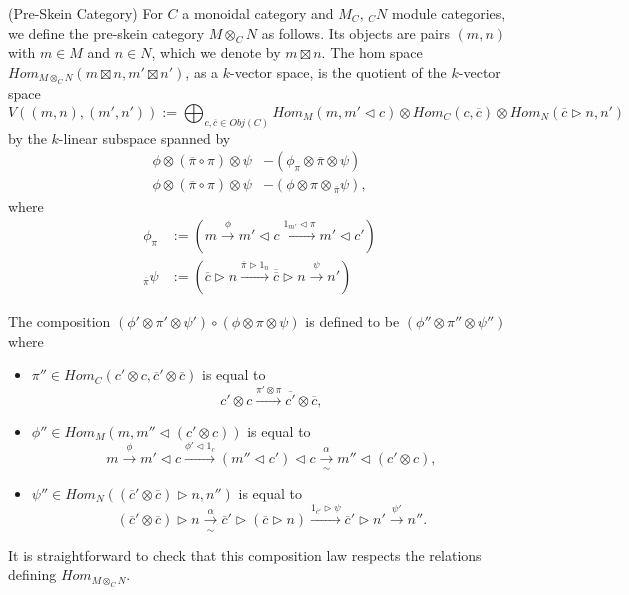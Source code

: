 \begin{definition}\label{pre-skein} (Pre-Skein Category)
  For $C$ a monoidal category and $M_C$, $_{C}N$ module categories, we define
  the pre-skein category $M\otimes_C N$ as follows. Its objects are pairs $(m,n)$ with
  $m\in M$ and $n\in N$, which we denote by $m\boxtimes n$. The hom space
  $Hom_{M\otimes_C N}(m\boxtimes n, m'\boxtimes n')$, as a $k$-vector space, is the quotient
  of the $k$-vector space $$V((m,n),(m',n')):=\bigoplus_{c,\overline{c} \in Obj(C)} Hom_{M}(m, m' \lhd c) \otimes Hom_{C}(c,\overline{c}) \otimes Hom_{N} (\overline{c} \rhd n, n')$$
  by the $k$-linear subspace spanned by
  \begin{align}
    \phi \otimes (\overline{\pi} \circ \pi) \otimes \psi &- (\phi_{\pi} \otimes \overline{\pi} \otimes \psi) \label{relation/a} \\
    \phi \otimes (\overline{\pi} \circ \pi) \otimes \psi &- (\phi \otimes \pi \otimes {}_{\overline{\pi}}\psi) \label{relation/b},
  \end{align}
  where
  \begin{align}
    \phi_{\pi}  &:= \left( m \xrightarrow{\phi} m' \lhd c \xrightarrow{1_{m'} \lhd \pi} m' \lhd c' \right) \\
    {}_{\overline{\pi}}\psi &:= \left( \overline{c} \rhd n \xrightarrow{\overline{\pi} \rhd 1_{n}} \overline{\overline{c}} \rhd n \xrightarrow{\psi} n' \right)
  \end{align}
  
    \begin{center}
    
  \end{center}
  
  \noindent The composition $(\phi' \otimes \pi' \otimes \psi' ) \circ (\phi \otimes \pi \otimes \psi)$ is defined to be $(\phi'' \otimes \pi'' \otimes \psi'')$ where
  \begin{itemize}
    \item
    $\pi'' \in Hom_{C}(c' \otimes c, \overline{c}' \otimes \overline{c})$ is equal to
    \[
      c' \otimes c \xrightarrow{\pi' \otimes \pi} \overline{c'} \otimes \overline{c},
    \]
    \item
    \noindent $\phi'' \in Hom_{M}(m, m'' \lhd (c' \otimes c))$ is equal to
    \[
      m \xrightarrow{\phi} m' \lhd c \xrightarrow{\phi' \lhd 1_{c}} (m'' \lhd c') \lhd c \xrightarrow[\sim]{\alpha} m'' \lhd (c' \otimes c),
    \]
    \item
    \noindent $\psi'' \in Hom_{N}((\overline{c}' \otimes \overline{c}) \rhd n, n'')$ is equal to
    \[
      (\overline{c}' \otimes \overline{c}) \rhd n \xrightarrow[\sim]{\alpha} \overline{c}' \rhd (\overline{c} \rhd n) \xrightarrow{1_{\overline{c}'} \rhd \psi} \overline{c}' \rhd n' \xrightarrow{\psi'} n''.
    \]
  \end{itemize}
  
    \begin{center}
    
  \end{center}
  It is straightforward to check that this composition law respects the relations defining $Hom_{M\otimes_C N}$.
\end{definition}

